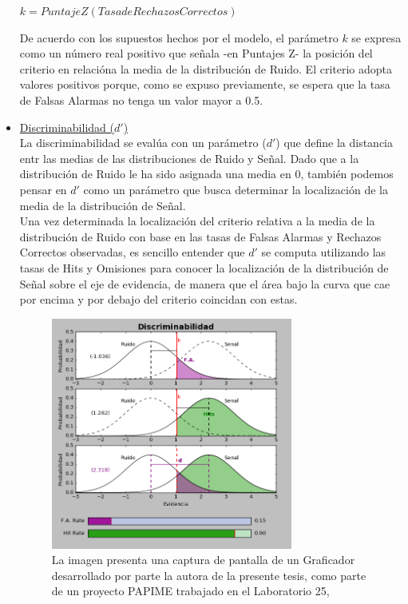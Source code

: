 \begin{itemize}
\begin{center}
$k = PuntajeZ(Tasa de Rechazos Correctos)$\\
\end{center}

De acuerdo con los supuestos hechos por el modelo, el parámetro $k$ se expresa como un número real positivo que señala -en Puntajes Z- la posición del criterio en relacióna la media de la distribución de Ruido. El criterio adopta valores positivos porque, como se expuso previamente, se espera que la tasa de Falsas Alarmas no tenga un valor mayor a 0.5.\\

\item \underline{Discriminabilidad ($d'$)}\\

La discriminabilidad se evalúa con un parámetro ($d'$) que define la distancia entr las medias de las distribuciones de Ruido y Señal. Dado que a la distribución de Ruido le ha sido asignada una media en 0, también podemos pensar en $d'$ como un parámetro que busca determinar la localización de la media de la distribución de Señal.\\ 

Una vez determinada la localización del criterio relativa a la media de la distribución de Ruido con base en las tasas de Falsas Alarmas y Rechazos Correctos observadas, es sencillo entender que $d'$ se computa utilizando las tasas de Hits y Omisiones para conocer la localización de la distribución de Señal sobre el eje de evidencia, de manera que el área bajo la curva que cae por encima y por debajo del criterio coincidan con estas.\\ 

\begin{figure}[th]
\centering
\includegraphics[width=0.75\textwidth]{Figures/Graficador_Discriminabilidad} 
\caption[Estimación de la discriminabilidad con base en las Tasas de Ejecución]{La imagen presenta una captura de pantalla de un Graficador desarrollado por parte la autora de la presente tesis, como parte de un proyecto PAPIME trabajado en el Laboratorio 25, \parencite{PAPIME}}
\label{fig:Graf_Discrim}
\end{figure}


\end{itemize}
